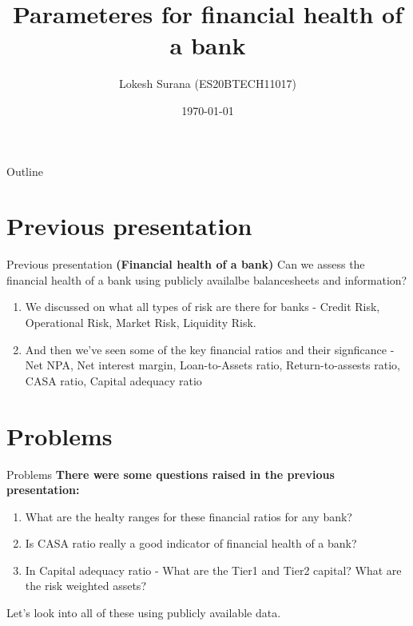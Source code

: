 \documentclass{beamer}
\title{Parameteres for financial health of a bank}
\author{Lokesh Surana (ES20BTECH11017)}
\date{\today}
\begin{document}
\begin{frame}
    \titlepage 
\end{frame}

\begin{frame}{Outline}
    \tableofcontents
\end{frame}

\section{Previous presentation}
\begin{frame}{Previous presentation}
	\textbf{(Financial health of a bank)} Can we assess the financial health of a bank using publicly availalbe balancesheets and information?
	\begin{enumerate}
		\item We discussed on what all types of risk are there for banks - Credit Risk, Operational Risk, Market Risk, Liquidity Risk.
		\item And then we've seen some of the key financial ratios and their signficance - Net NPA, Net interest margin, Loan-to-Assets ratio, Return-to-assests ratio, CASA ratio, Capital adequacy ratio
	\end{enumerate}
\end{frame}

\section{Problems}
\begin{frame}{Problems}
	\textbf{There were some questions raised in the previous presentation:}
	\begin{enumerate}
		\item What are the healty ranges for these financial ratios for any bank?
		\item Is CASA ratio really a good indicator of financial health of a bank?
		\item In Capital adequacy ratio - What are the Tier1 and Tier2 capital? What are the risk weighted assets?
	\end{enumerate}
	Let's look into all of these using publicly available data.
\end{frame}
\end{document}
